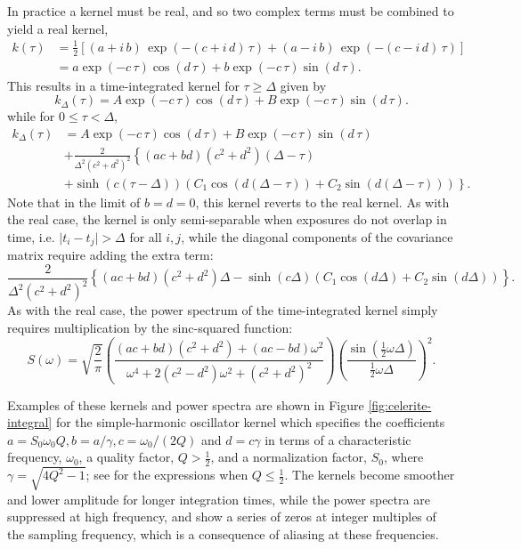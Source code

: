 \documentclass[modern]{aastex62}
\begin{document}
In practice a kernel must be real, and so two complex terms must be
combined to yield a real kernel,
\begin{align}
k(\tau) &= \tfrac{1}{2}\left[(a + i\,b)\,\exp\left(-(c+i\,d)\,\tau\right)+ (a - i\,b)\,\exp\left(-(c-i\,d)\,\tau\right) \right]\\
&= a \exp\left(-c\,\tau\right)\cos\left(d\,\tau\right) + b \exp\left(-c\,\tau\right)\sin\left(d\,\tau\right).
\end{align}
This results in a time-integrated kernel for $\tau \ge \Delta$ given by
\begin{equation}
k_\Delta(\tau) = A\exp\left(-c\,\tau\right)\cos\left(d\,\tau\right) + B\exp\left(-c\,\tau\right)\sin\left(d\,\tau\right).
\end{equation}
while for $0 \le \tau < \Delta$,
\begin{align}
k_\Delta(\tau) &= A\exp\left(-c\,\tau\right)\cos\left(d\,\tau\right) + B\exp\left(-c\,\tau\right)\sin\left(d\,\tau\right) \nonumber\\
&+  \frac{2}{ \Delta^2(c^2+d^2)^2} \left\{(ac+bd)(c^2+d^2)(\Delta-\tau)\right. \nonumber \\
&+\left.  \sinh(c(\tau-\Delta)) \left(C_1\cos(d(\Delta-\tau)) +C_2 \sin(d(\Delta-\tau))\right) \right\}.
\end{align}
Note that in the limit of $b = d = 0$, this kernel reverts to the real kernel.
As with the real case, the kernel is only semi-separable when exposures
do not overlap in time, i.e. $\vert t_i - t_j \vert > \Delta$ for all $i,j$, while the diagonal
components of the covariance matrix require adding the extra term:
\begin{equation}
\frac{2}{ \Delta^2(c^2+d^2)^2} \left\{(ac+bd)(c^2+d^2)\Delta
-\sinh(c\Delta) \left(C_1\cos(d\Delta) +C_2 \sin(d\Delta)\right) \right\}.
\end{equation}
As with the real case, the power spectrum of the time-integrated kernel simply
requires multiplication by the sinc-squared function:
\begin{equation}
S(\omega) = \sqrt{\frac{2}{\pi}} \left(\frac{(ac+bd)(c^2+d^2)+(ac-bd)\omega^2}
{\omega^4+2(c^2-d^2)\omega^2+(c^2+d^2)^2}\right)
\left( \frac{\sin(\tfrac{1}{2}\omega \Delta)}{\tfrac{1}{2}\omega\Delta}\right)^2.
\end{equation}

Examples of these kernels and power spectra are shown in Figure \ref{fig:celerite-integral}
for the simple-harmonic oscillator kernel which specifies the coefficients
$a = S_0\omega_0 Q, b=a/\gamma, c=\omega_0/(2Q)$ and $d=c\gamma$ in terms of a characteristic
frequency, $\omega_0$, a quality factor, $Q > \tfrac{1}{2}$, and a normalization
factor, $S_0$, where $\gamma = \sqrt{4Q^2-1}$;  see \citet{Foreman-Mackey:2017} for the
expressions when $Q \le \tfrac{1}{2}$.
The kernels become smoother and lower amplitude for longer integration times,
while the power spectra are suppressed at high frequency, and show a series of
zeros at integer multiples of the sampling frequency, which is a consequence
of aliasing at these frequencies.
\end{document}
